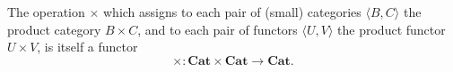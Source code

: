 The operation $\times$ which assigns to each pair of (small) categories $\langle B, C \rangle$ the product category $B \times C$, and to each pair of functors $\langle U, V \rangle$ the product functor $U \times V$, is itself a functor
$$\times: \mathbf{Cat} \times \mathbf{Cat} \to \mathbf{Cat}.$$

